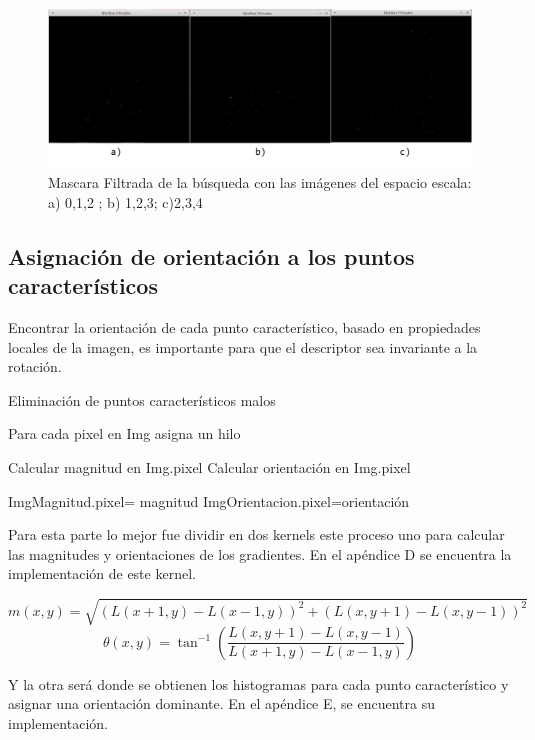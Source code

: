 \begin{figure}[h]
			\centering
				\includegraphics[scale=0.3]{img/minmax.jpg}
			\caption{Mascara Filtrada de la búsqueda con las imágenes del espacio escala: a) 0,1,2 ; b) 1,2,3; c)2,3,4  }
\end{figure}



\subsection{Asignación de orientación a los puntos característicos}

Encontrar la orientación de cada punto característico, basado en propiedades locales de la imagen, es importante para que el descriptor sea invariante a la rotación.


\begin{algorithm}[H]
\caption{Eliminación de puntos característicos malos}
 Para cada pixel en Img asigna un hilo\;
 
 {
	Calcular magnitud en Img.pixel\;
	Calcular orientación en Img.pixel\;
	
	ImgMagnitud.pixel= magnitud\;
	ImgOrientacion.pixel=orientación\;
	
}
\end{algorithm}



Para esta parte lo mejor fue dividir en dos kernels este proceso uno para calcular las magnitudes y orientaciones de los gradientes. En el apéndice D se encuentra la implementación de este kernel.

$$m(x,y) = \sqrt{ (L(x+1,y)-L(x-1,y))^2 + (L(x,y+1)-L(x,y-1))^2 }$$		
$$\theta(x,y) =  \tan^{-1} \left(\frac{L(x,y+1)-L(x,y-1)}{L(x+1,y)-L(x-1,y)}\right)$$


Y la otra será donde se obtienen los histogramas para cada punto característico y asignar una orientación dominante. En el apéndice E, se encuentra su implementación. 




